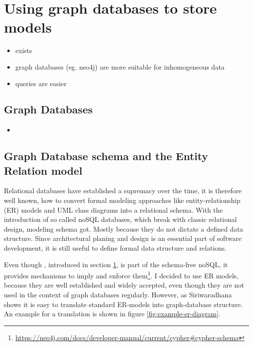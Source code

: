 \section{Using graph databases to store \sysbio models}
\label{sec:graph-db}
\begin{itemize}
	\item \masymos exists
	\item graph databases (eg. neo4j) are more suitable for inhomogeneous data
	\item queries are easier
\end{itemize}

\subsection{Graph Databases}
\begin{itemize}
	\item {}
\end{itemize}

\subsection{Graph Database schema and the Entity Relation model}
\label{sec:graph-db:er}
Relational databases have established a supremacy over the time, it is therefore well known, how to convert formal modeling approaches like entity-relationship (ER) models and UML class diagrams into a relational schema. With the introduction of so called noSQL databases, which break with classic relational design, modeling schema got. Mostly because they do not dictate a defined data structure.
Since architectural planing and design is an essential part of software development, it is still useful to define formal data structure and relations.

Even though \neoj, introduced in section \ref{sec:graph-db}, is part of the schema-free noSQL, it provides mechanisms to imply and enforce them\footnote{\url{https://neo4j.com/docs/developer-manual/current/cypher\#cypher-schema}}.
I decided to use ER models, because they are well established and widely accepted, even though they are not used in the context of graph databases regularly.
However, as Siriwaradhana shows it is easy to translate standard ER-models into graph-database structure. \cite{Siriwaradhana2014}
An example for a translation is shown in figure \ref{fig:example-er-diagram}.

